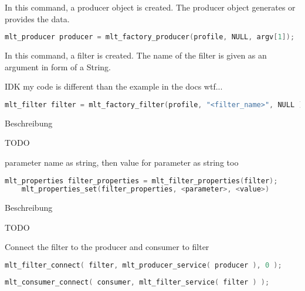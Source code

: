 \documentclass[../MasterThesis.tex]{subfiles}
\begin{document}
\begin{description}[font=\normalfont\color{RedViolet!80!black}, style=nextline]
	In this command, a producer object is created. The producer object generates or provides the data.
	
	\begin{lstlisting}[language=C, numbers=none, basicstyle=\scriptsize\ttfamily]
	 mlt_producer producer = mlt_factory_producer(profile, NULL, argv[1]); \end{lstlisting}
	
	
	
	\item[Create a filter] 
	
	In this command, a filter is created. The name of the filter is given as an argument in form of a String.
	
	IDK my code is different than the example in the docs wtf...
	
	\begin{lstlisting}[language=C, numbers=none, basicstyle=\scriptsize\ttfamily]
	mlt_filter filter = mlt_factory_filter(profile, "<filter_name>", NULL ); \end{lstlisting}



	\item[Create a filter properties] Beschreibung
	
	TODO
	
	parameter name as string, then value for parameter as string too

	\begin{lstlisting}[language=C, numbers=none, basicstyle=\scriptsize\ttfamily]
	mlt_properties filter_properties = mlt_filter_properties(filter);
	mlt_properties_set(filter_properties, <parameter>, <value>) \end{lstlisting}
	
	
	
	
	\item[Connect elements] Beschreibung
	
	TODO
	
	Connect the filter to the producer and consumer to filter
	
	\begin{lstlisting}[language=C, numbers=none, basicstyle=\scriptsize\ttfamily]
	mlt_filter_connect( filter, mlt_producer_service( producer ), 0 ); \end{lstlisting}
	
	\begin{lstlisting}[language=C, numbers=none, basicstyle=\scriptsize\ttfamily]
	mlt_consumer_connect( consumer, mlt_filter_service( filter ) ); \end{lstlisting}
	

\end{description}
\end{document}
